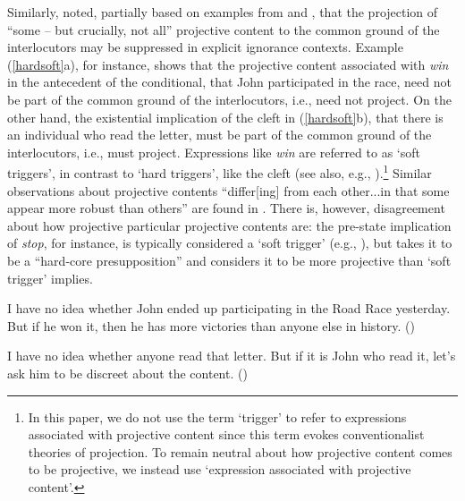 \documentclass[11pt,fleqn]{article}
\newcommand{\6}{\mbox{$[\hspace*{-.6mm}[$}}
\newcommand{\9}{\mbox{$]\hspace*{-.6mm}]$}}
\def\infelic{{\leavevmode\llap{\#}}}
\begin{document}
Similarly, \citet[432]{simons01} noted, partially based on examples from \citealt{ccmg90} and \citealt{geurts94}, that the projection of ``some -- but crucially, not all'' projective content to the common ground of the interlocutors may be suppressed in explicit ignorance contexts. Example (\ref{hardsoft}a), for instance, shows that the projective content associated with {\em win} in the antecedent of the conditional, that John participated in the race, need not be part of the common ground of the interlocutors, i.e., need not project. On the other hand, the existential implication of the cleft in (\ref{hardsoft}b), that there is an individual who read the letter, must be part of the common ground of the interlocutors, i.e., must project. Expressions like {\em win} are referred to as `soft triggers', in contrast to `hard triggers', like the cleft (see also, e.g., \citealt{abusch10,abrusan2016}).\footnote{In this paper, we do not use the term `trigger' to refer to expressions associated with projective content since this term evokes conventionalist theories of projection. To remain neutral about how projective content comes to be projective, we instead use `expression associated with projective content'.} Similar observations about projective contents ``differ[ing] from each other...in that some appear more robust than others'' are found in \citealt[ch.11]{kadmon01}. There is, however, disagreement about how projective particular projective contents are: the pre-state implication of {\em stop}, for instance, is typically considered a `soft trigger' (e.g., \citealt{simons01,chemla09b,romoli2015}), but \citet[222]{kadmon01} takes it to be a ``hard-core presupposition'' and \citet{abrusan2011,abrusan2016} considers it to be more projective than `soft trigger' implies.

\begin{exe}
\ex\label{hardsoft}
\begin{xlist}

\ex I have no idea whether John ended up participating in the Road Race yesterday. But if he won it, then he has more victories than anyone else in history. \hfill (\citealt[39]{abusch10})

\ex\infelic I have no idea whether anyone read that letter. But if it is John
who read it, let's ask him to be discreet about the content. \hfill (\citealt[40]{abusch10})

\end{xlist}
\end{exe}
\end{document}
